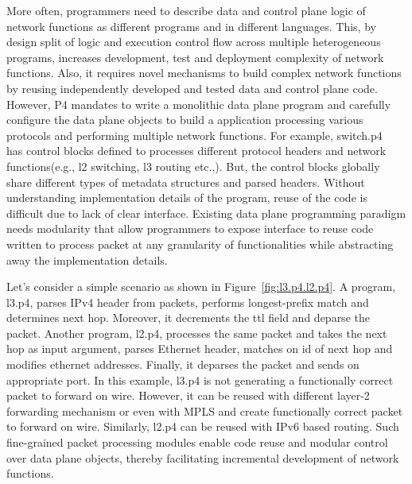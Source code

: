 \documentclass[10pt,sigconf,letterpaper,anonymous]{acmart}
\begin{document}
More often, programmers need to describe data and control plane logic of network functions as different programs and in different languages.
This, by design split of logic and execution control flow across multiple heterogeneous programs, increases development, test and deployment complexity of network functions.
Also, it requires novel mechanisms to build complex network functions by reusing independently developed and tested data and control plane code.
However, P4 mandates to write a monolithic data plane program and carefully configure the data plane objects to build a application processing various protocols and performing multiple network functions.
For example, switch.p4~\cite{switch.p4} has control blocks defined to processes different protocol headers and network functions(e.g., l2 switching, l3 routing etc.,). 
But, the control blocks globally share different types of metadata structures and parsed headers. 
Without understanding implementation details of the program, reuse of the code is difficult due to lack of clear interface.
Existing data plane programming paradigm needs modularity that allow programmers to expose interface to reuse code written to process packet at any granularity of functionalities while abstracting away the implementation details.

Let's consider a simple scenario as shown in Figure~\ref{fig:l3.p4.l2.p4}. A program, l3.p4, parses IPv4 header from packets, performs longest-prefix match and determines next hop. 
Moreover, it decrements the ttl field and deparse the packet. 
Another program, l2.p4, processes the same packet and takes the next hop as input argument, parses Ethernet header, matches on id of next hop and modifies ethernet addresses.
Finally, it deparses the packet and sends on appropriate port.
In this example, l3.p4 is not generating a functionally correct packet to forward on wire. 
However, it can be reused with different layer-2 forwarding mechanism or even with MPLS and create functionally correct packet to forward on wire. 
Similarly, l2.p4 can be reused with IPv6 based routing.
Such fine-grained packet processing modules enable code reuse and modular control over data plane objects, thereby facilitating incremental development of network functions. 
\end{document}
